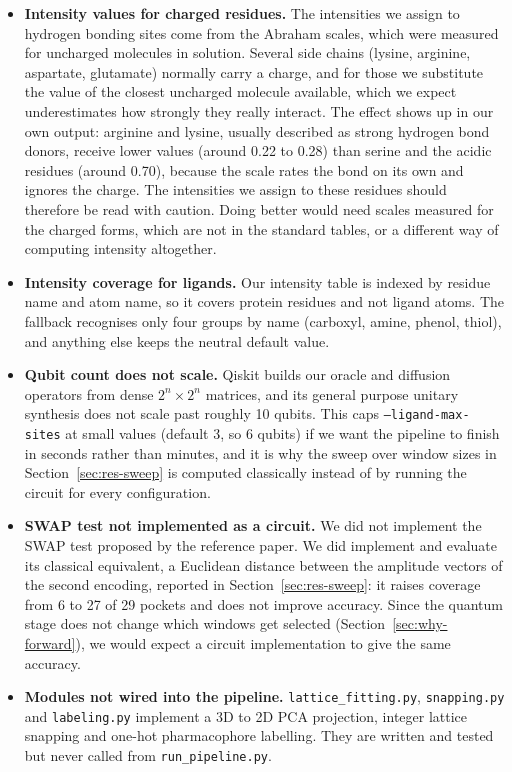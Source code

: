 \begin{itemize}[leftmargin=1.5em]
    \item \textbf{Intensity values for charged residues.} The intensities we assign to
    hydrogen bonding sites come from the Abraham scales, which were measured for
    uncharged molecules in solution. Several side chains (lysine, arginine, aspartate,
    glutamate) normally carry a charge, and for those we substitute the value of the
    closest uncharged molecule available, which we expect underestimates how strongly
    they really interact. The effect shows up in our own output: arginine and lysine,
    usually described as strong hydrogen bond donors, receive lower values (around 0.22
    to 0.28) than serine and the acidic residues (around 0.70), because the scale rates
    the bond on its own and ignores the charge. The intensities we assign to these
    residues should therefore be read with caution. Doing better would need scales
    measured for the charged forms, which are not in the standard tables, or a different
    way of computing intensity altogether.
    \item \textbf{Intensity coverage for ligands.} Our intensity table is indexed by
    residue name and atom name, so it covers protein residues and not ligand atoms. The
    fallback recognises only four groups by name (carboxyl, amine, phenol, thiol), and
    anything else keeps the neutral default value.
    \item \textbf{Qubit count does not scale.} Qiskit builds our oracle and diffusion
    operators from dense $2^{n} \times 2^{n}$ matrices, and its general purpose unitary
    synthesis does not scale past roughly 10 qubits. This caps
    \texttt{--ligand-max-sites} at small values (default 3, so 6 qubits) if we want the
    pipeline to finish in seconds rather than minutes, and it is why the sweep over
    window sizes in Section~\ref{sec:res-sweep} is computed classically instead of by
    running the circuit for every configuration.
    \item \textbf{SWAP test not implemented as a circuit.} We did not implement the SWAP
    test proposed by the reference paper. We did implement and evaluate its classical
    equivalent, a Euclidean distance between the amplitude vectors of the second
    encoding, reported in Section~\ref{sec:res-sweep}: it raises coverage from 6 to 27 of
    29 pockets and does not improve accuracy. Since the quantum stage does not change
    which windows get selected (Section~\ref{sec:why-forward}), we would expect a circuit
    implementation to give the same accuracy.
    \item \textbf{Modules not wired into the pipeline.} \texttt{lattice\_fitting.py},
    \texttt{snapping.py} and \texttt{labeling.py} implement a 3D to 2D PCA projection,
    integer lattice snapping and one-hot pharmacophore labelling. They are written and
    tested but never called from \texttt{run\_pipeline.py}.
\end{itemize}

